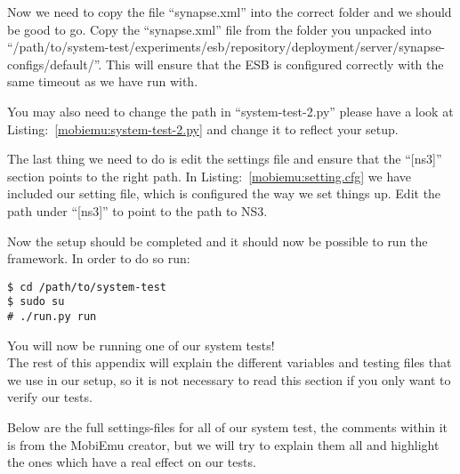     Now we need to copy the file “synapse.xml” into the correct folder and we should be good to go. Copy the “synapse.xml” file from the folder you unpacked into “/path/to/system-test/experiments/esb/repository/deployment/server/synapse-configs/default/”. This will ensure that the ESB is configured correctly with the same timeout as we have run with.

    You may also need to change the path in “system-test-2.py” please have a look at Listing:~\ref{mobiemu:system-test-2.py} and change it to reflect your setup.

    The last thing we need to do is edit the settings file and ensure that the “[ns3]” section points to the right path. In Listing:~\ref{mobiemu:setting.cfg} we have included our setting file, which is configured the way we set things up. Edit the path under “[ns3]” to point to the path to NS3.

Now the setup should be completed and it should now be possible to run the framework. In order to do so run:
\lstset{language=bash, style=shell}
\begin{lstlisting}[frame=single, caption={Run MobiEmu}, label=mobiemu:run, breaklines=true]
$ cd /path/to/system-test
$ sudo su
# ./run.py run
\end{lstlisting}

    You will now be running one of our system tests!\\

    The rest of this appendix will explain the different variables and testing files that we use in our setup, so it is not necessary to read this section if you only want to verify our tests.

    Below are the full settings-files for all of our system test, the comments within it is from the MobiEmu creator, but we will try to explain them all and highlight the ones which have a real effect on our tests.

